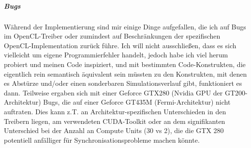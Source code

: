 	
		\subparagraph{Bugs}
		\label{sec:oclBugs}
		Während der Implementierung sind mir einige Dinge aufgefallen, die ich auf Bugs im OpenCL-Treiber
		oder zumindest auf Beschränkungen der spezifischen OpenCL-Implementation zurück führe.
		Ich will nicht ausschließen, dass es sich vielleicht um eigene Programmierfehler handelt, jedoch habe ich
		viel herum probiert und meinen Code inspiziert, und mit bestimmten Code-Konstrukten, die eigentlich
		rein semantisch äquivalent sein müssten zu den Konstrukten, mit denen es Abstürze und/oder einen sonderbaren
		Simulationsverlauf gibt, funktioniert es dann.
		Teilweise ergaben sich mit einer Geforce GTX280 (Nvidia GPU der GT200-Architektur) 
		Bugs, die auf einer Geforce GT435M (Fermi-Architektur) nicht auftraten.
		Dies kann z.T. an Architektur-spezifischen Unterschieden in den Treibern liegen, am verwendeten
		CUDA-Toolkit oder an dem signifikanten Unterschied bei der Anzahl an Compute Units (30 vs 2), die die
		GTX 280 potentiell anfälliger für Synchronisationsprobleme machen könnte.
		
